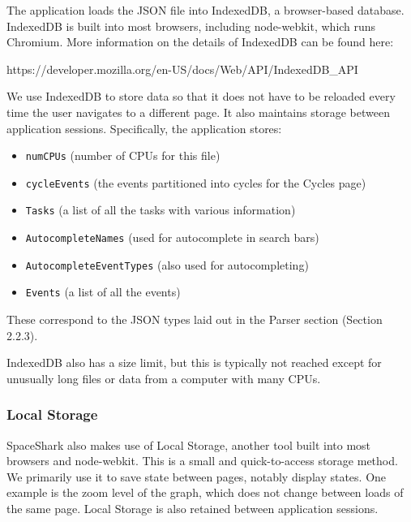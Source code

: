 \documentclass{hmcclinic}
\begin{document}
  The application loads the JSON file into IndexedDB, a
  browser-based database. IndexedDB is built into most browsers, including
  node-webkit, which runs Chromium. More information on the details of IndexedDB can be found here:
\begin{center}
  https://developer.mozilla.org/en-US/docs/Web/API/IndexedDB\_API
\end{center}
  We use IndexedDB to store data so that it does not have to be reloaded every time the user navigates to a different page. It also
  maintains storage between application sessions.
  Specifically, the application stores:
  \begin{itemize}
    \item \texttt{numCPUs} (number of CPUs for this file)
    \item \texttt{cycleEvents} (the events partitioned into cycles for the Cycles page)
    \item \texttt{Tasks} (a list of all the tasks with various information)
    \item \texttt{AutocompleteNames} (used for autocomplete in search bars)
    \item \texttt{AutocompleteEventTypes} (also used for autocompleting)
    \item \texttt{Events} (a list of all the events)
  \end{itemize}
  These correspond to the JSON types laid
  out in the Parser section (Section 2.2.3).


  IndexedDB also has  a size limit, but this is typically not reached except for
  unusually long files or data from a computer with many CPUs. 

  \subsubsection{Local Storage}

  SpaceShark also makes use of Local Storage, another tool
  built into most browsers and node-webkit. This is a small and quick-to-access
  storage method. We primarily use it to save state between pages, notably
  display states. One example is the zoom level of the graph, which does not
  change between loads of the same page. Local Storage is also retained between
  application sessions.
\end{document}
